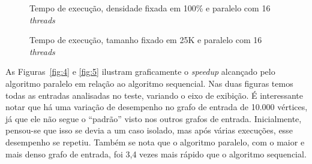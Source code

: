 \documentclass[12pt]{article}
\begin{document}
\begin{figure}[H]
    \centering
    \begin{minipage}{.48\textwidth}
        \centering
        \resizebox{\textwidth}{!}
        {
		}
        \caption{Tempo de execução, densidade fixada em 100\% e paralelo com 16 \emph{threads}}
        \label{fig:2}
    \end{minipage}\hfill%
    \begin{minipage}{.48\textwidth}
        \centering
        \resizebox{\textwidth}{!}
        {
		}
        \caption{Tempo de execução, tamanho fixado em 25K e paralelo com 16 \emph{threads}}
        \label{fig:3}
    \end{minipage}
\end{figure}

As Figuras~\ref{fig:4} e \ref{fig:5} ilustram graficamente o \emph{speedup} alcançado pelo algoritmo paralelo em relação ao algoritmo sequencial. Nas duas figuras temos todas as entradas analisadas no teste, variando o eixo de exibição. É interessante notar que há uma variação de desempenho no grafo de entrada de 10.000 vértices, já  que ele não segue o “padrão” visto nos outros grafos de entrada. Inicialmente, pensou-se que isso se devia a um caso isolado, mas após várias execuções, esse desempenho se repetiu. Também se nota que o algoritmo paralelo, com o maior e mais denso grafo de entrada, foi 3,4 vezes mais rápido que o algoritmo sequencial.
\end{document}
